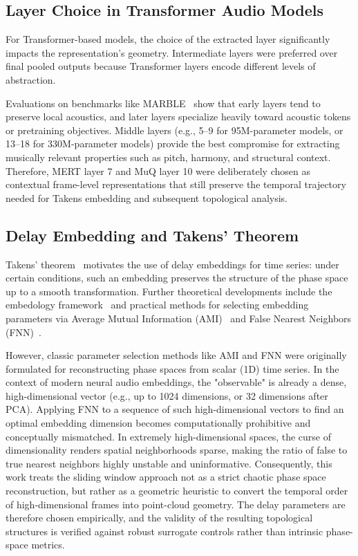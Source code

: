 \subsection{Layer Choice in Transformer Audio Models}

For Transformer-based models, the choice of the extracted layer significantly impacts the representation's geometry. Intermediate layers were preferred over final pooled outputs because Transformer layers encode different levels of abstraction. 

Evaluations on benchmarks like MARBLE~\cite{yuan2023marble} show that early layers tend to preserve local acoustics, and later layers specialize heavily toward acoustic tokens or pretraining objectives. Middle layers (e.g., 5--9 for 95M-parameter models, or 13--18 for 330M-parameter models) provide the best compromise for extracting musically relevant properties such as pitch, harmony, and structural context. Therefore, MERT layer 7 and MuQ layer 10 were deliberately chosen as contextual frame-level representations that still preserve the temporal trajectory needed for Takens embedding and subsequent topological analysis.

\subsection{Delay Embedding and Takens' Theorem}

Takens' theorem~\cite{takens1981detecting} motivates the use of delay embeddings for time series: under certain conditions, such an embedding preserves the structure of the phase space up to a smooth transformation. Further theoretical developments include the embedology framework~\cite{sauer1991embedology} and practical methods for selecting embedding parameters via Average Mutual Information (AMI)~\cite{fraser1986independent} and False Nearest Neighbors (FNN)~\cite{kennel1992determining, wallot2018calculation}.

However, classic parameter selection methods like AMI and FNN were originally formulated for reconstructing phase spaces from scalar (1D) time series. In the context of modern neural audio embeddings, the "observable" is already a dense, high-dimensional vector (e.g., up to 1024 dimensions, or 32 dimensions after PCA). Applying FNN to a sequence of such high-dimensional vectors to find an optimal embedding dimension becomes computationally prohibitive and conceptually mismatched. In extremely high-dimensional spaces, the curse of dimensionality renders spatial neighborhoods sparse, making the ratio of false to true nearest neighbors highly unstable and uninformative. Consequently, this work treats the sliding window approach not as a strict chaotic phase space reconstruction, but rather as a geometric heuristic to convert the temporal order of high-dimensional frames into point-cloud geometry. The delay parameters are therefore chosen empirically, and the validity of the resulting topological structures is verified against robust surrogate controls rather than intrinsic phase-space metrics.

